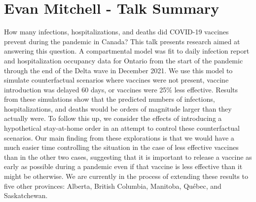 
\section{Evan Mitchell - Talk Summary}

How many infections, hospitalizations, and deaths did COVID-19 vaccines prevent during the pandemic in Canada? This talk presents research aimed at answering this question. A compartmental model was fit to daily infection report and hospitalization occupancy data for Ontario from the start of the pandemic through the end of the Delta wave in December 2021. We use this model to simulate counterfactual scenarios where vaccines were not present, vaccine introduction was delayed 60 days, or vaccines were 25\% less effective. Results from these simulations show that the predicted numbers of infections, hospitalizations, and deaths would be orders of magnitude larger than they actually were. To follow this up, we consider the effects of introducing a hypothetical stay-at-home order in an attempt to control these counterfactual scenarios. Our main finding from these explorations is that we would have a much easier time controlling the situation in the case of less effective vaccines than in the other two cases, suggesting that it is important to release a vaccine as early as possible during a pandemic even if that vaccine is less effective than it might be otherwise. We are currently in the process of extending these results to five other provinces: Alberta, British Columbia, Manitoba, Qu\'{e}bec, and Saskatchewan.

